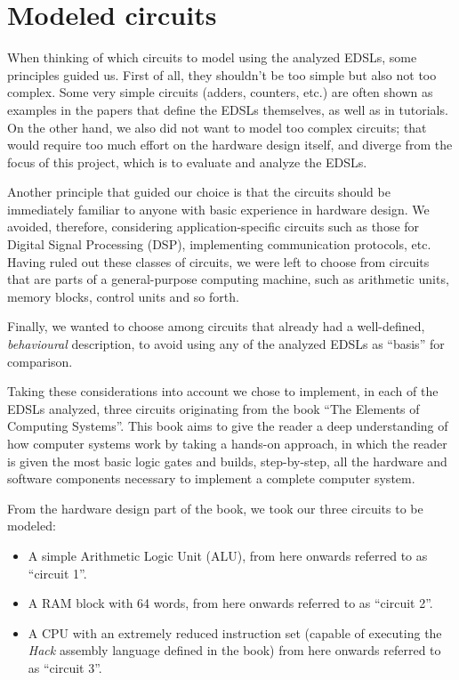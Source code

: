 \section{Modeled circuits}
\label{sec:circuits}

    When thinking of which circuits to model using the analyzed \acp{EDSL}, some principles guided
    us.  First of all, they shouldn't be too simple but also not too complex. Some very simple
    circuits (adders, counters, etc.) are often shown as examples in the papers that define the
    \acp{EDSL} themselves, as well as in tutorials. On the other hand, we also did not want to model
    too complex circuits; that would require too much effort on the hardware design itself, and
    diverge from the focus of this project, which is to evaluate and analyze the \acp{EDSL}.

    Another principle that guided our choice is that the circuits should be immediately familiar to
    anyone with basic experience in hardware design. We avoided, therefore, considering
    application-specific circuits such as those for Digital Signal Processing (DSP), implementing
    communication protocols, etc. Having ruled out these classes of circuits, we were left to choose
    from circuits that are parts of a general-purpose computing machine, such as arithmetic units,
    memory blocks, control units and so forth.

    Finally, we wanted to choose among circuits that already had a well-defined, \emph{behavioural}
    description, to avoid using any of the analyzed \acp{EDSL} as ``basis'' for comparison.

    Taking these considerations into account we chose to implement, in each of the \acp{EDSL}
    analyzed, three circuits originating from the book ``The Elements of Computing
    Systems''\cite{nand2tetris-book}. This book aims to give the reader a deep understanding of how
    computer systems work by taking a hands-on approach, in which the reader is given the most basic
    logic gates and builds, step-by-step, all the hardware and software components necessary to
    implement a complete computer system.

    From the hardware design part of the book, we took our three circuits to be modeled:

    \begin{itemize}
        \item A simple Arithmetic Logic Unit (ALU), from here onwards referred to as ``circuit 1''.

        \item A RAM block with 64 words, from here onwards referred to as ``circuit 2''.

        \item A CPU with an extremely reduced instruction set (capable of executing the \emph{Hack}
            assembly language defined in the book) from here onwards referred to as ``circuit 3''.
    \end{itemize}

